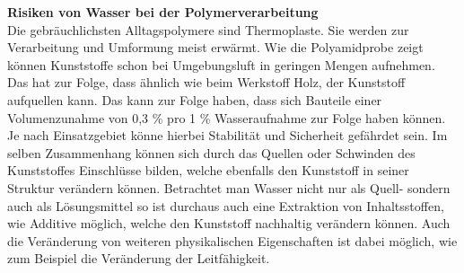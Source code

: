 \newpage

\textbf{Risiken von Wasser bei der Polymerverarbeitung}\\
Die gebräuchlichsten Alltagspolymere sind Thermoplaste. Sie werden zur Verarbeitung und Umformung meist erwärmt. Wie die Polyamidprobe zeigt können Kunststoffe schon bei Umgebungsluft in geringen Mengen aufnehmen. Das hat zur Folge, dass ähnlich wie beim Werkstoff Holz, der Kunststoff aufquellen kann. Das kann zur Folge haben, dass sich Bauteile einer Volumenzunahme von 0,3 \% pro 1 \% Wasseraufnahme zur Folge haben können.\cite{XXX} Je nach Einsatzgebiet könne  hierbei Stabilität und Sicherheit gefährdet sein. Im selben Zusammenhang können sich durch das Quellen oder Schwinden des Kunststoffes Einschlüsse bilden, welche ebenfalls den Kunststoff in seiner Struktur verändern können. Betrachtet man Wasser nicht nur als Quell- sondern auch als Lösungsmittel so ist durchaus auch eine Extraktion von Inhaltsstoffen, wie Additive möglich, welche den Kunststoff nachhaltig verändern können. Auch die Veränderung von weiteren physikalischen Eigenschaften ist dabei möglich, wie zum Beispiel die Veränderung der Leitfähigkeit.\cite{XX} 